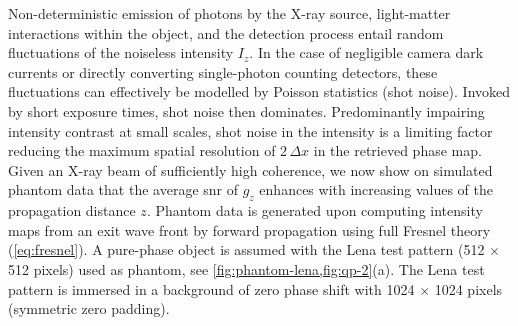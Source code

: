 \documentclass[
twoside,
openright,
titlepage,
numbers=noenddot,
headinclude,
fleqn,
a4paper,
footinclude=true,
cleardoublepage=empty,
abstractoff,
BCOR=5mm,
paper=a4,
fontsize=11pt,
british,ngerman,american,
]{scrreprt}
\begin{document}
Non-deterministic emission of photons by the X-ray source,
light-matter interactions within the object, and the detection process
entail random fluctuations of the noiseless intensity $I_z$.  In the
case of negligible camera dark currents or directly converting
single-photon counting detectors, these fluctuations can effectively
be modelled by Poisson statistics (shot noise).  Invoked by short
exposure times, shot noise then dominates.  Predominantly impairing
intensity contrast at small scales, shot noise in the intensity is a
limiting factor reducing the maximum spatial resolution of $2\,\Delta
x$ in the retrieved phase map.  Given an X-ray beam of sufficiently
high coherence, we now show on simulated phantom data that the average
\acf{snr} of $g_z$ enhances with increasing values of the propagation
distance $z$.  Phantom data is generated upon computing intensity maps
from an exit wave front by forward propagation using full Fresnel
theory (\cref{eq:fresnel}).  A pure-phase object is assumed with the
Lena test pattern (512 $\times$ 512 pixels) used as phantom, see
\cref{fig:phantom-lena,fig:qp-2}(a).  The Lena test pattern is
immersed in a background of zero phase shift with 1024 $\times$ 1024
pixels (symmetric zero padding).
\end{document}

